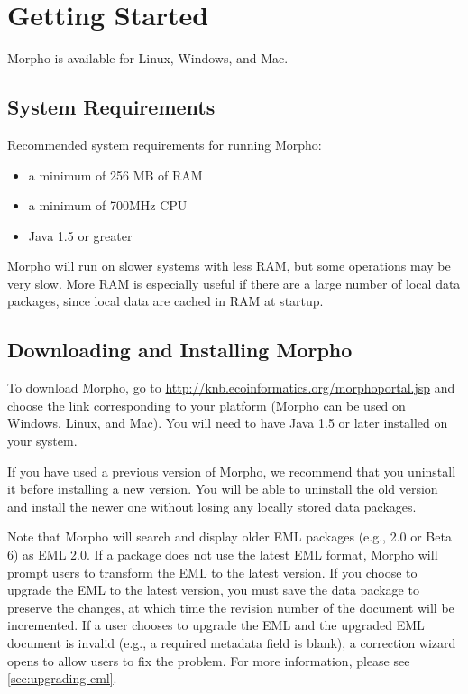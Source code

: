 \section{Getting Started}

Morpho is available for Linux, Windows, and Mac. 

\subsection{System Requirements}

Recommended system requirements for running Morpho: 
\begin{itemize}
 \item a minimum of 256 MB of RAM 
 \item a minimum of 700MHz CPU 
 \item Java 1.5 or greater 
\end{itemize}

Morpho will run on slower systems with less RAM, but some operations may
be very slow. More RAM is especially useful if there are a large number
of local data packages, since local data are cached in RAM at startup. 

\subsection{Downloading and Installing Morpho}

To download Morpho, go to
\url{http://knb.ecoinformatics.org/morphoportal.jsp}
and choose the link corresponding to your platform (Morpho can be used
on Windows, Linux, and Mac). You will need to have Java 1.5 or later
installed on your system.

If you have used a previous version of Morpho, we recommend that you
uninstall it before installing a new version. You will be able to
uninstall the old version and install the newer one without losing any
locally stored data packages. 

Note that Morpho will search and display older EML packages (e.g., 2.0
or Beta 6) as EML 2.0. If a package does not use the latest EML format,
Morpho will prompt users to transform the EML to the latest version. If
you choose to upgrade the EML to the latest version, you must save the
data package to preserve the changes, at which time the revision number
of the document will be incremented. If a user chooses to upgrade the
EML and the upgraded EML document is invalid (e.g., a required metadata
field is blank), a correction wizard opens to allow users to fix the
problem. For more information, please see \autoref{sec:upgrading-eml}.

